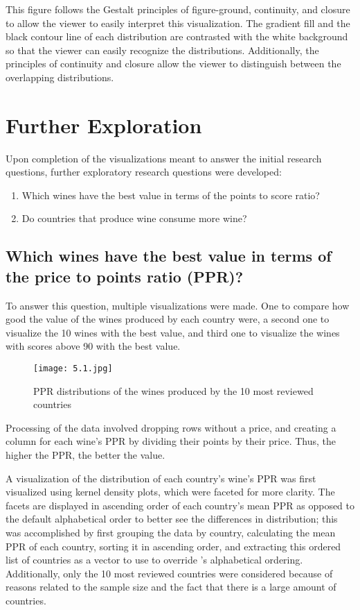 This figure follows the Gestalt principles of figure-ground, continuity, and closure to allow the viewer to easily interpret this visualization. The gradient fill and the black contour line of each distribution are contrasted with the white background so that the viewer can easily recognize the distributions. Additionally, the principles of continuity and closure allow the viewer to distinguish between the overlapping distributions.


\section{Further Exploration}

Upon completion of the visualizations meant to answer the initial research questions, further exploratory research questions were developed:

\begin{enumerate}
  \item Which wines have the best value in terms of the points to score ratio? 
  \item Do countries that produce wine consume more wine?
\end{enumerate}

\subsection{Which wines have the best value in terms of the price to points ratio (PPR)?}

To answer this question, multiple visualizations were made. One to compare how good the value of the wines produced by each country were, a second one to visualize the 10 wines with the best value, and third one to visualize the wines with scores above 90 with the best value.

\begin{figure}[h]
  \texttt{[image: 5.1.jpg]}
  \caption{PPR distributions of the wines produced by the 10 most reviewed countries} %
\end{figure}

Processing of the data involved dropping rows without a price, and creating a column for each wine's PPR by dividing their points by their price. Thus, the higher the PPR, the better the value.

A visualization of the distribution of each country's wine's PPR was first visualized using kernel density plots, which were faceted for more clarity. The facets are displayed in ascending order of each country's mean PPR as opposed to the default alphabetical order to better see the differences in distribution; this was accomplished by first grouping the data by country, calculating the mean PPR of each country, sorting it in ascending order, and extracting this ordered list of countries as a vector to use to override 's alphabetical ordering. Additionally, only the 10 most reviewed countries were considered because of reasons related to the sample size and the fact that there is a large amount of countries.

